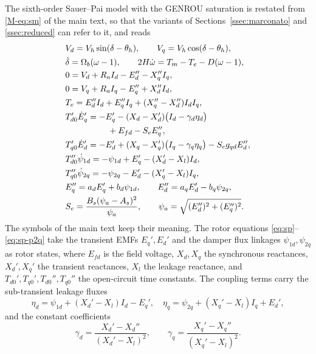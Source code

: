 \documentclass[10pt,journal]{IEEEtran}
\begin{document}
The sixth-order Sauer--Pai model \cite{sauer2018} with the GENROU saturation \cite{cui2021} is restated from \eqref{M-eq:sm} of the main text, so that the variants of Sections~\ref{ssec:marconato} and \ref{ssec:reduced} can refer to it, and reads
\begin{subequations}\label{eq:sm}
\begin{align}
&V_d=V_h\sin(\delta-\theta_h),\qquad V_q=V_h\cos(\delta-\theta_h),\label{eq:park}\\
&\dot\delta=\Omega_b(\omega-1),\qquad
2H\dot\omega=T_m-T_e-D(\omega-1),\label{eq:swing}\\
&0=V_d+R_aI_d-E_d''-X_q''I_q,\label{eq:stator}\\
&0=V_q+R_aI_q-E_q''+X_d''I_d,\label{eq:stator-q}\\
&T_e=E_d''I_d+E_q''I_q+(X_q''-X_d'')I_dI_q,\label{eq:torque}\\
&T_{d0}'\dot E_q'=-E_q'-(X_d-X_d')\bigl(I_d-\gamma_d\eta_d\bigr)\notag\\
&\qquad\qquad\quad+E_{fd}-S_eE_q'',\label{eq:sp}\\
&T_{q0}'\dot E_d'=-E_d'+(X_q-X_q')\bigl(I_q-\gamma_q\eta_q\bigr)-S_eg_{qd}E_d'',\label{eq:sp-ed}\\
&T_{d0}''\dot\psi_{1d}=-\psi_{1d}+E_q'-(X_d'-X_l)I_d,\label{eq:sp-p1d}\\
&T_{q0}''\dot\psi_{2q}=-\psi_{2q}-E_d'-(X_q'-X_l)I_q,\label{eq:sp-p2q}\\
&E_q''=a_dE_q'+b_d\psi_{1d},\qquad
E_d''=a_qE_d'-b_q\psi_{2q},\label{eq:sp-emf}\\
&S_e=\frac{B_s(\psi_a-A_s)^2}{\psi_a},\qquad
\psi_a=\sqrt{(E_d'')^2+(E_q'')^2}.\label{eq:sat}
\end{align}
\end{subequations}
The symbols of the main text keep their meaning.
The rotor equations \eqref{eq:sp}--\eqref{eq:sp-p2q} take the transient EMFs $E_q',E_d'$ and the damper flux linkages $\psi_{1d},\psi_{2q}$ as rotor states, where $E_{fd}$ is the field voltage, $X_d,X_q$ the synchronous reactances, $X_d',X_q'$ the transient reactances, $X_l$ the leakage reactance, and $T_{d0}',T_{q0}',T_{d0}'',T_{q0}''$ the open-circuit time constants.
The coupling terms carry the sub-transient leakage fluxes
\begin{equation}\label{eq:eta}
\eta_d=\psi_{1d}+(X_d'-X_l)I_d-E_q',\quad
\eta_q=\psi_{2q}+(X_q'-X_l)I_q+E_d',
\end{equation}
and the constant coefficients
\begin{equation}\label{eq:gamma}
\gamma_d=\frac{X_d'-X_d''}{(X_d'-X_l)^2},\qquad
\gamma_q=\frac{X_q'-X_q''}{(X_q'-X_l)^2}.
\end{equation}
\end{document}
